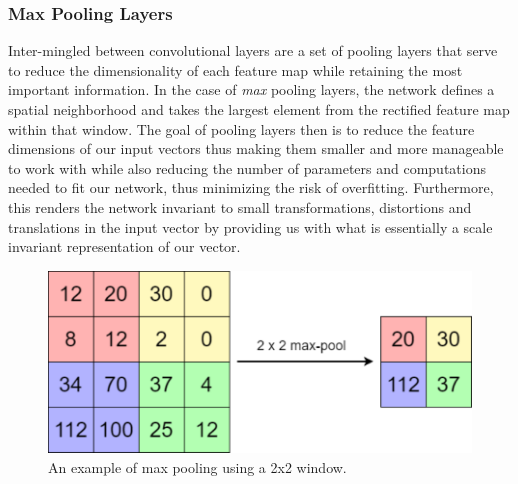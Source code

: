 \subsubsection{Max Pooling Layers}
\label{subsubsec:Background-Information:Forecasting-Models:Convolutional-Neural-Networks:Max-Pooling-Layers}
Inter-mingled between convolutional layers are a set of pooling layers that serve to reduce the dimensionality of each feature map while retaining the most important information. In the case of \textit{max} pooling layers, the network defines a spatial neighborhood and takes the largest element from the rectified feature map within that window. The goal of pooling layers then is to reduce the feature dimensions of our input vectors thus making them smaller and more manageable to work with while also reducing the number of parameters and computations needed to fit our network, thus minimizing the risk of overfitting. Furthermore, this renders the network invariant to small transformations, distortions and translations in the input vector by providing us with what is essentially a scale invariant representation of our vector.

\begin{figure}[hbt!]
    \centering
    \includegraphics[width=\textwidth]{Images/Chapter 3/CNN/Max-Pooling-Illustration.pdf}
    \caption{An example of max pooling using a 2x2 window.}
    \label{fig:Max-Pooling-Illustration}
\end{figure}


